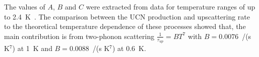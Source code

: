 The values of $A$, $B$ and $C$ were extracted from data for
temperature ranges of up to 2.4~K~\cite{Leung2016}. The comparison
between the UCN production and upscattering rate to the theoretical
temperature dependence of these processes showed that, the main
contribution is from two-phonon scattering $\frac{1}{\tau_{up}}=BT^7$
with $B = 0.0076$~/(s K$^7$) at 1~K and $B = 0.0088$~/(s K$^7$) at
0.6~K\cite{Leung2016}.











